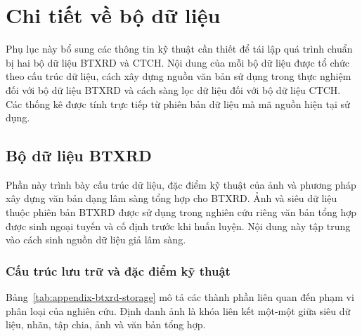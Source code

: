 \appendix

\chapter{Chi tiết về bộ dữ liệu}
\label{Appendix1}

Phụ lục này bổ sung các thông tin kỹ thuật cần thiết để tái lập quá trình chuẩn bị hai bộ dữ liệu BTXRD và CTCH. Nội dung của mỗi bộ dữ liệu được tổ chức theo cấu trúc dữ liệu, cách xây dựng nguồn văn bản sử dụng trong thực nghiệm đối với bộ dữ liệu BTXRD và cách sàng lọc dữ liệu đối với bộ dữ liệu CTCH. Các thống kê được tính trực tiếp từ phiên bản dữ liệu mà mã nguồn hiện tại sử dụng.

\section{Bộ dữ liệu BTXRD}
\label{AppendixBTXRD}

Phần này trình bày cấu trúc dữ liệu, đặc điểm kỹ thuật của ảnh và phương pháp xây dựng văn bản dạng lâm sàng tổng hợp cho BTXRD. Ảnh và siêu dữ liệu thuộc phiên bản BTXRD được sử dụng trong nghiên cứu riêng văn bản tổng hợp được sinh ngoại tuyến và cố định trước khi huấn luyện. Nội dung này tập trung vào cách sinh nguồn dữ liệu giả lâm sàng.

\subsection{Cấu trúc lưu trữ và đặc điểm kỹ thuật}

Bảng~\ref{tab:appendix-btxrd-storage} mô tả các thành phần liên quan đến phạm vi phân loại của nghiên cứu. Định danh ảnh là khóa liên kết một-một giữa siêu dữ liệu, nhãn, tập chia, ảnh và văn bản tổng hợp.

